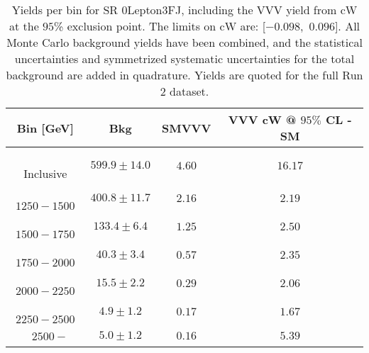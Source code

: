 \begin{table}[!htbp]
    \small
    \center
    \begin{tabular}{c||c|c|c}
    Bin [GeV] & Bkg & SMVVV & \pbox{20cm}{VVV \\ cW @ $95\%$ CL - SM \\ }\\
    \hline
    \pbox{20cm}{ ~ \\Inclusive\\ } & $599.9 \pm 14.0$ & $4.60$ & $16.17$\\
    \hline
    \pbox{20cm}{ ~ \\$1250-1500$\\ } & $400.8 \pm 11.7$ & $2.16$ & $2.19$\\
    \hline
    \pbox{20cm}{ ~ \\$1500-1750$\\ } & $133.4 \pm 6.4$ & $1.25$ & $2.50$\\
    \hline
    \pbox{20cm}{ ~ \\$1750-2000$\\ } & $40.3 \pm 3.4$ & $0.57$ & $2.35$\\
    \hline
    \pbox{20cm}{ ~ \\$2000-2250$\\ } & $15.5 \pm 2.2$ & $0.29$ & $2.06$\\
    \hline
    \pbox{20cm}{ ~ \\$2250-2500$\\ } & $4.9 \pm 1.2$ & $0.17$ & $1.67$\\
    \hline
    \pbox{20cm}{ ~ \\$2500-$\\ } & $5.0 \pm 1.2$ & $0.16$ & $5.39$\\
\end{tabular}
    \caption{Yields per bin for SR 0Lepton3FJ, including the VVV yield from cW at the $95$\% exclusion point. The limits on cW are: [$-0.098$,~$0.096$]. All Monte Carlo background yields have been combined, and the statistical uncertainties and symmetrized systematic uncertainties for the total background are added in quadrature. Yields are quoted for the full Run 2 dataset.}
    \label{tab:0Lepton3FJ$binssignal}
\end{table}
